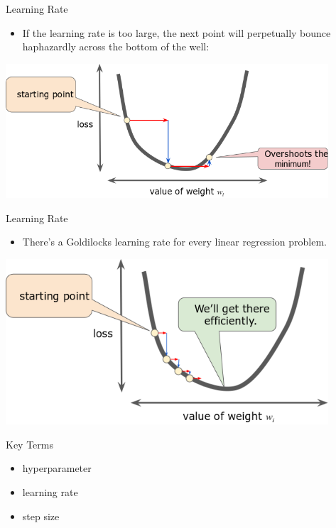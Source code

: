 \documentclass{beamer}
\begin{document}

\begin{frame}{Learning Rate}
\begin{itemize}
\item If the learning rate is too large, the next point will perpetually bounce haphazardly across the bottom of the well:
\end{itemize}
\includegraphics[width=0.9\textwidth]{images/LearningRateTooLarge.png}
\end{frame}


\begin{frame}{Learning Rate}
\begin{itemize}
\item There's a Goldilocks learning rate for every linear regression problem.
\end{itemize}
\includegraphics[width=0.9\textwidth]{images/LearningRateJustRight.png}
\end{frame}


\begin{frame}{Key Terms}
\begin{itemize}
\item hyperparameter
\item learning rate
\item step size
\end{itemize}
\end{frame}
\end{document}

